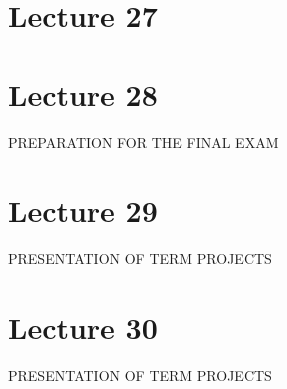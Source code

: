 \section{Lecture 27}

\section{Lecture 28}

PREPARATION FOR THE FINAL EXAM


\section{Lecture 29}

PRESENTATION OF TERM PROJECTS


\section{Lecture 30}

PRESENTATION OF TERM PROJECTS






\bye




















                                                                   



                                       




                                    

























